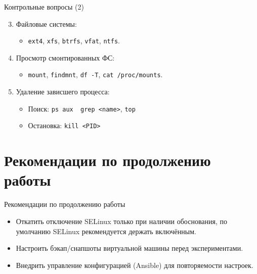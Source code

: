 \documentclass[
  ignorenonframetext,
  aspectratio=169,
  russian,
  aspectratio=169]{beamer}
\providecommand{\tightlist}{%
  \setlength{\itemsep}{0pt}\setlength{\parskip}{0pt}}
\begin{document}
\begin{frame}[fragile]{Контрольные вопросы (2)}
\label{ux43aux43eux43dux442ux440ux43eux43bux44cux43dux44bux435-ux432ux43eux43fux440ux43eux441ux44b-2}
\begin{enumerate}[<+->]
\setcounter{enumi}{2}
\item
  Файловые системы:

  \begin{itemize}[<+->]
  \tightlist
  \item
    \texttt{ext4}, \texttt{xfs}, \texttt{btrfs}, \texttt{vfat},
    \texttt{ntfs}.
  \end{itemize}
\item
  Просмотр смонтированных ФС:

  \begin{itemize}[<+->]
  \tightlist
  \item
    \texttt{mount}, \texttt{findmnt}, \texttt{df\ -T},
    \texttt{cat\ /proc/mounts}.
  \end{itemize}
\item
  Удаление зависшего процесса:

  \begin{itemize}[<+->]
  \tightlist
  \item
    Поиск:
    \texttt{ps\ aux\ \textbar{}\ grep\ \textless{}name\textgreater{}},
    \texttt{top}
  \item
    Остановка: \texttt{kill\ \textless{}PID\textgreater{}}
  \end{itemize}
\end{enumerate}
\end{frame}

\section{Рекомендации по продолжению
работы}\label{ux440ux435ux43aux43eux43cux435ux43dux434ux430ux446ux438ux438-ux43fux43e-ux43fux440ux43eux434ux43eux43bux436ux435ux43dux438ux44e-ux440ux430ux431ux43eux442ux44b}

\begin{frame}{Рекомендации по продолжению работы}
\begin{itemize}[<+->]
\tightlist
\item
  Откатить отключение SELinux только при наличии обоснования, по
  умолчанию SELinux рекомендуется держать включённым.
\item
  Настроить бэкап/снапшоты виртуальной машины перед экспериментами.
\item
  Внедрить управление конфигурацией (Ansible) для повторяемости
  настроек.
\end{itemize}
\end{frame}
\end{document}
